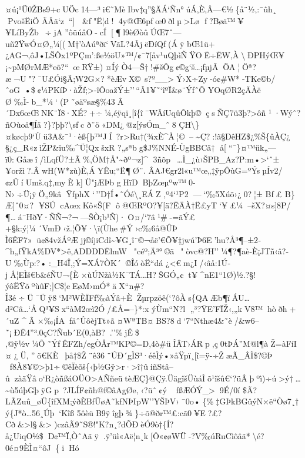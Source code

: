 ¤ú¡¹Ü0ŽBs9+cUÖc14---³i€˜MèIbv‡q''§ÄÁ`Ñn°úÁ,È,Â---€½\{å¨½‚:¯ûh¸ PvošËiÖ
ÃÂä`z``{]} \&ƒ"Ë¦d! 4y@Œ6pƒœ0ðlµ\textgreater Lø
f?Bøä™¥¥LíByŽb~÷jA''ôüúâO- cÍ{[}¶l9è Øòû­ÚŒ7ˆ---uñ2ŸwÓ¤Ø„¼{[}(M†'òAúªðï`VãL?4ÃjëÐíQƒ(Áÿ
bŒ1ü+¿AG¬‚ôJ•LŠÔx1ºPÇm':ße½öU»™/¢¯7{[}åv¹uQþìÑŸOË \textbar÷ËW‚À\textbackslashÐPHýŒ¥¡\textasciitilde pMØrMÆ*eõ?{}``œRŸ±)¤ÍýÒ4---Š†!\#šÔg¢©g`­š\ldots¡ƒµjÃÖA¦Öª?æ¬U"?¯U£Ói§Ä;W2G×?*èÆvX©~s?º\_\_\textgreaterÝ›X÷Zy-ó¢\#W*-TKe©b/ˆoG•\$¢¼PKíÞ·àŽƒ;\textgreater-îÔoažÝ±''\,``Â1¥˜`îºÏ\&ø¨ÝfˆÕ
YOqØ­R2çÄÀë
Ø‰Ì-b\_*¼`(P ˜øäºsæ§\%43Â´Dx6œŒNK¨Ï8·XÉ?+÷¼‚éÿqï¸{[}î\{î¯WÂíUqûÔkþ©çsÑÇ7ü3þ?\textgreater ôñ
¹·Wýˆ?ñOùoå¶Íä?\}?þþ?\textbackslash sƒc ð¨ö«DM¿@z{[}ýsÓm\_ˆ8
ÇH\textbackslash\}¤køcþ9`Ùü3A\&¯¹·èß\{þ™JÍ~?r\textgreater Ru†(¾xÈ\^{}Å¦©--\textasciitilde Ç?:!ã§DêHZ\$¿\%Š\{ûÀÇ¿
§¿ç\_R«zìŽP\&ïu‰\^{}Ü¦QxšxR ?„sªbg\$J\%NNÉ-ÙgBBCä†
å{[}``¯\}¤™ük„---ï0:Gåæî/ìLqƒÜ?±­Ã\%,ÖM†Å"\textasciitilde ðº¬z{]}\^{}
3ñõp~\ldots Ì\_¿ù›ŠPB\_Az?P:m•\textgreater`ˆ±¥oržì?.ÂwH(W*zù)È,ÁYÊu;``Ë¶Ø¨ .
ÂAJ€gr2l«u™œ„‡ÿpÔùG=ºÝsµÍv2/¢zÛí Umš.q‡,myÈ k{]}Ü"jÆÞb
gHïDBþZœµºw™0-N›÷Ü¡ÿÖ„9kâŸƒphX`\,''D†Í•˜Óé\textbackslash¸EÁZ
,º4`¹P2---`‰5Xúõ›¿0?¦± Bƒ£ B\}Æ{]}ˆ0¤? ¥SÚcAœxKô«Š(F
ô\textquotesingle@ŒRºO?¥{[}ä?ËÄÀ†Ë£yT`¥£¼--šX?¤s{]}8P/¶\ldotsá¯HðY·ÑÑ¬?¬---ŠÒ¡b¹Ñ)·O¤/`7â¹\#-=ãÝ£+§k:ý¦¼´VmÐ‹ž.¦Õ¥·\textbackslash ï(Ùhe\#Ý›c‰6å@ÛÞ
Ì6ÊF7 »ü¢84vžÁºÆjj©íjiCdî \textasciitilde¥G¸î¨©¬åë'€Õ¥‡jwú'Þ6E'hu?­Å³¶--±2­\^{}h„fŸkA\%DV*\textgreater ê‚A D D D DËlmW"céº;Ä³°©ã~"òvc@?H''¼¶?¶aè-È¡JTñ‹â?-U‰Ùp:?•:\_H4Î,;Ý=XÁ7ÒK´©ÎóòË``dá
¿\textless€m¿I/‹âå:1Ú­jÅ¦EÌš€b\&éÑU¬\{È\textquotesingle×ùÚNžà½K¯TÁ\ldots H?ŠGÓ„¢t¥\^{}nE1``1Ø)½.?§!ýôËŸõºùûF;{]}C\$¦eEøM›mÓ*äX``n\#?Î3é÷Ü¯Üÿ8`M²WÈ ÏFƒ‰àÝâ+È Žµrpzöê(`?ôÀs\{QAÆb¶ï\textbar ÁU\ldots d²Câ\ldots`ÅQ³¥Sx``àM2œì2Ó/£Å=--\}*:x
ýÙm``N?l „³?ŸE'FÏŽ‹,„kV8™hòðh+´uZ \^{}Ã
×‰¡ÍAƒäˆÛôèjTt»ã¤WªTB¤BS?8d`7``Nthæ4\&˜è/\&w6--˜¡ÐË 4''³.0çC?Ñub´E(0‚àB?.''\%jÊ­\$‚@ÿ½v¼Õ˜ÝƒÊFZh/egÒÅr™KP©=D‚4ò\#üÎÂT›ÁRp,ç0tÞÁ''M@l¶\textbar àŽ=àFíI¤¿Ü‚''õ€KÈ~þå†\$Ž¨ê36¨ÚÐ´gÌS³·éê­Ìý•»åŸpï¸{[}î=ÿ-÷ŽæÃ\_ÂÌ\$?©Þ
   f8À8¥©\textgreater þ1÷©êÏèõš\{‹þ½Gÿ\textgreater r·\textgreater î†ûiñStâ--ûzàãŸâo`R¿òñßáOÜO\textgreater AÑñeütèÆÇ\}@Çÿ.ÜägîšÜù\textquotesingle áÌ\textbar õ¹îšû€`?üÂþºì)÷ú\textgreater ý†\ldots\textasciitilde ù5úþGþÿGp~?JLÍF¢ñh@ƒ©âAgØe‚‹?üˆ¢ýfßÆÓÝ\_\textgreater9É/0í
\$Ã?LÃZuû\_ø\textquotesingle Ü\{îfXM;ýðÈBfÜøA˜kƒNÞIpW''YŠÞV›¯0o•\{\%‡GÞkBGûýN×ë``Òø7¸†ý\{J*ò\ldots56¸Úþ`Kîß
5ôèüB9ÿîgþ¾\}÷õ@ðr™£:cã0¥E?£?Cð\&\textgreater l§\&\textgreater{})czâÃ9˜S®!"K?n¸?dÕÐèÓ9ò†\{Í?å¿UiqO½\$\textquotesingleD¢™Ï,ÒˆAãÿ.ÿ'üì«Aë¦n¸k{[}Ô«¢øWÜ-?V‰úRuCìôâã*\textbackslash\textbar\textbar é?0é¤9ÈÌ¤``ôJ\{iHó
